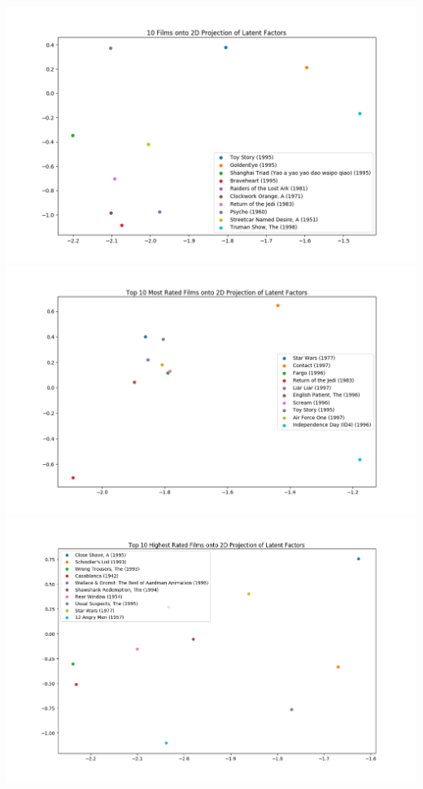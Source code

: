 \documentclass[titlepage]{article}
\begin{document}
\begin{center}
    \includegraphics[width=\textwidth]{mat_fac_1.png} \\
    \includegraphics[width=\textwidth]{mat_fac_2.png} \\
    \includegraphics[width=\textwidth]{mat_fac_3.png} \\

\end{center}
\end{document}
